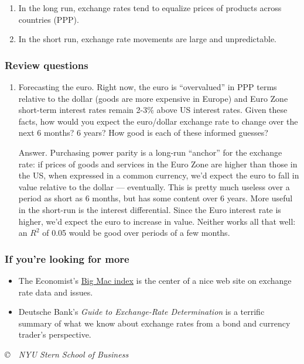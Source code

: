 \documentclass[letterpaper,12pt]{article}
\begin{document}
\begin{enumerate}
\item In the long run, exchange rates tend to
equalize prices of products across countries (PPP).

\item In the short run, exchange rate movements are large
and unpredictable.
\end{enumerate}

\subsubsection*{Review questions}

\begin{enumerate}

\item Forecasting the euro.
Right now, the euro is ``overvalued'' in PPP terms relative to the
dollar (goods are more expensive in Europe) and Euro Zone short-term interest rates remain 2-3\% above US interest rates.
Given these facts, how would you expect the euro/dollar exchange rate to change over the next 6 months?  6 years?
How good is each of these informed guesses?

Answer.  Purchasing power parity is a long-run ``anchor'' for the
exchange rate:  if prices of goods and services in the Euro Zone
are higher than those in the US, when expressed in a common currency,
we'd expect the euro to fall in value relative to the dollar
--- eventually.
This is pretty much useless over a period as short as 6 months,
but has some content over 6 years.
More useful in the short-run is the interest differential.
Since the Euro interest rate is higher, we'd expect the euro to increase in value.
Neither works all that well:  an $R^2$ of 0.05 would be good over
periods of a few months.

\end{enumerate}


\subsubsection*{If you're looking for more}

%
\begin{itemize}
\item The Economist's
\href{http://www.economist.com/markets/Bigmac/index.cfm}{Big Mac index}
is the center of a nice web site on exchange rate data and issues.

\item Deutsche Bank's
{\it Guide to Exchange-Rate Determination\/} is a terrific
summary of what we know about exchange rates from a
bond and currency trader's perspective.

\end{itemize}

\vfill \centerline{\it \copyright \ \number\year \
NYU Stern School of Business}
\end{document}
